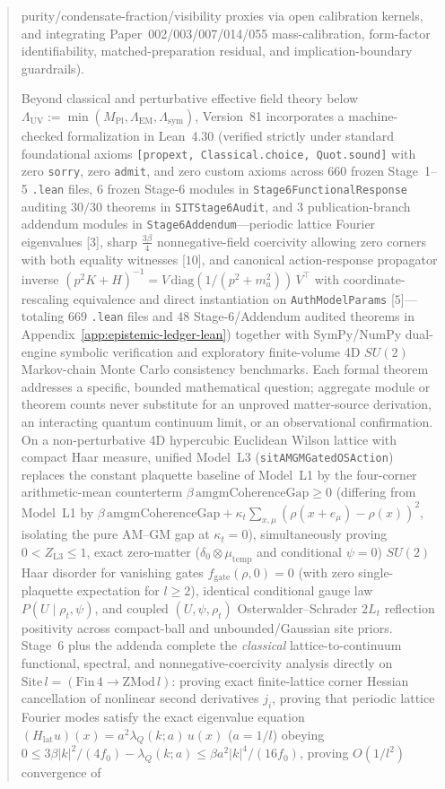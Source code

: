 \begin{abstract}
purity/condensate-fraction/visibility proxies via open calibration kernels, and integrating Paper~002/003/007/014/055 mass-calibration, form-factor identifiability, matched-preparation residual, and implication-boundary guardrails).

Beyond classical and perturbative effective field theory below $\Lambda_{\mathrm{UV}} := \min(M_{\mathrm{Pl}}, \Lambda_{\mathrm{EM}}, \Lambda_{\mathrm{sym}})$, Version~81 incorporates a machine-checked formalization in Lean~4.30 (verified strictly under standard foundational axioms \texttt{[propext, Classical.\allowbreak{}choice, Quot.\allowbreak{}sound]} with zero \texttt{sorry}, zero \texttt{admit}, and zero custom axioms across $660$ frozen Stage~1--5 \texttt{.lean} files, $6$ frozen Stage-6 modules in \texttt{Stage6FunctionalResponse} auditing $30/30$ theorems in \texttt{SITStage6Audit}, and $3$ publication-branch addendum modules in \texttt{Stage6Addendum}---periodic lattice Fourier eigenvalues [$3$], sharp $\frac{3\beta}{4}$ nonnegative-field coercivity allowing zero corners with both equality witnesses [$10$], and canonical action-response propagator inverse $(p^2 K + H)^{-1} = V\,\mathrm{diag}(1/(p^2+m_a^2))\,V^\top$ with coordinate-rescaling equivalence and direct instantiation on \texttt{AuthModelParams} [$5$]---totaling $669$ \texttt{.lean} files and $48$ Stage-6/Addendum audited theorems in Appendix~\ref{app:epistemic-ledger-lean}) together with SymPy/NumPy dual-engine symbolic verification and exploratory finite-volume 4D $SU(2)$ Markov-chain Monte Carlo consistency benchmarks. Each formal theorem addresses a specific, bounded mathematical question; aggregate module or theorem counts never substitute for an unproved matter-source derivation, an interacting quantum continuum limit, or an observational confirmation. On a non-perturbative 4D hypercubic Euclidean Wilson lattice with compact Haar measure, unified Model~L3 (\texttt{sitAMGMGatedOSAction}) replaces the constant plaquette baseline of Model~L1 by the four-corner arithmetic-mean counterterm $\beta\,\mathrm{amgmCoherenceGap} \ge 0$ (differing from Model~L1 by $\beta\,\mathrm{amgmCoherenceGap} + \kappa_t\sum_{x,\mu}(\rho(x+e_\mu)-\rho(x))^2$, isolating the pure AM--GM gap at $\kappa_t = 0$), simultaneously proving $0 < Z_{\mathrm{L3}} \le 1$, exact zero-matter ($\delta_0 \otimes \mu_{\mathrm{temp}}$ and conditional $\psi = 0$) $SU(2)$ Haar disorder for vanishing gates $f_{\mathrm{gate}}(\rho,0) = 0$ (with zero single-plaquette expectation for $l \ge 2$), identical conditional gauge law $P(U \mid \rho_t,\psi)$, and coupled $(U,\psi,\rho_t)$ Osterwalder--Schrader $2L_t$ reflection positivity across compact-ball and unbounded/Gaussian site priors. Stage~6 plus the addenda complete the \emph{classical} lattice-to-continuum functional, spectral, and nonnegative-coercivity analysis directly on $\mathrm{Site}\,l = (\mathrm{Fin}\,4 \to \mathrm{ZMod}\,l)$: proving exact finite-lattice corner Hessian cancellation of nonlinear second derivatives $j_i$, proving that periodic lattice Fourier modes satisfy the exact eigenvalue equation $(H_{\mathrm{lat}} u)(x) = a^2\lambda_Q(k;a)\,u(x)$ ($a = 1/l$) obeying $0 \le 3\beta|k|^2/(4f_0) - \lambda_Q(k;a) \le \beta a^2|k|^4/(16f_0)$, proving $O(1/l^2)$ convergence of 
\end{abstract}
